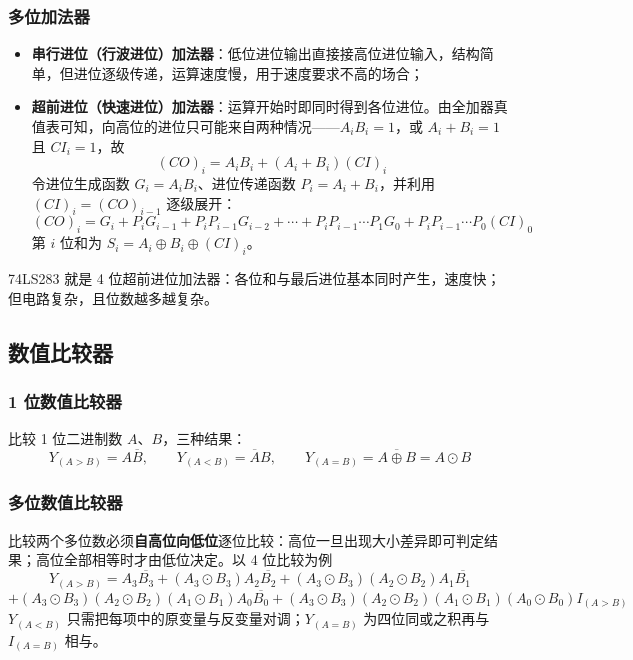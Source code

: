 \subsubsection{多位加法器}
\begin{itemize}
    \item \textbf{串行进位（行波进位）加法器}：低位进位输出直接接高位进位输入，结构简单，但进位逐级传递，运算速度慢，用于速度要求不高的场合；
    \item \textbf{超前进位（快速进位）加法器}：运算开始时即同时得到各位进位。由全加器真值表可知，向高位的进位只可能来自两种情况——\(A_iB_i=1\)，或 \(A_i+B_i=1\) 且 \(CI_i=1\)，故
    \[
    \left(CO\right)_i=A_iB_i+\left(A_i+B_i\right)\left(CI\right)_i
    \]
    令进位生成函数 \(G_i=A_iB_i\)、进位传递函数 \(P_i=A_i+B_i\)，并利用 \((CI)_i=(CO)_{i-1}\) 逐级展开：
    \[
    \left(CO\right)_i=G_i+P_iG_{i-1}+P_iP_{i-1}G_{i-2}+\cdots+P_iP_{i-1}\cdots P_1G_0+P_iP_{i-1}\cdots P_0\left(CI\right)_0
    \]
    第 \(i\) 位和为 \(S_i=A_i\oplus B_i\oplus\left(CI\right)_i\)。
\end{itemize}
74LS283 就是 4 位超前进位加法器：各位和与最后进位基本同时产生，速度快；但电路复杂，且位数越多越复杂。

\subsection{数值比较器}
\subsubsection{1 位数值比较器}
比较 1 位二进制数 \(A\)、\(B\)，三种结果：
\[
Y_{(A>B)}=A\overline{B},\qquad
Y_{(A<B)}=\overline{A}B,\qquad
Y_{(A=B)}=\overline{A\oplus B}=A\odot B
\]

\subsubsection{多位数值比较器}
比较两个多位数必须\textbf{自高位向低位}逐位比较：高位一旦出现大小差异即可判定结果；高位全部相等时才由低位决定。以 4 位比较为例
\[
Y_{(A>B)}=A_3\overline{B_3}+\left(A_3\odot B_3\right)A_2\overline{B_2}
+\left(A_3\odot B_3\right)\left(A_2\odot B_2\right)A_1\overline{B_1}
\]
\[
+\left(A_3\odot B_3\right)\left(A_2\odot B_2\right)\left(A_1\odot B_1\right)A_0\overline{B_0}
+\left(A_3\odot B_3\right)\left(A_2\odot B_2\right)\left(A_1\odot B_1\right)\left(A_0\odot B_0\right)I_{(A>B)}
\]
\(Y_{(A<B)}\) 只需把每项中的原变量与反变量对调；\(Y_{(A=B)}\) 为四位同或之积再与 \(I_{(A=B)}\) 相与。

